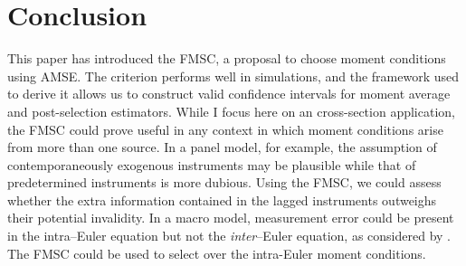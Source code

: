 \section{Conclusion}
\label{sec:conclude}
This paper has introduced the FMSC, a proposal to choose moment conditions using AMSE. 
The criterion performs well in simulations, and the framework used to derive it allows us to construct valid confidence intervals for moment average and post-selection estimators.  
While I focus here on an cross-section application, the FMSC could prove useful in any context in which moment conditions arise from more than one source. 
In a panel model, for example, the assumption of contemporaneously exogenous instruments may be plausible while that of predetermined instruments is more dubious.
Using the FMSC, we could assess whether the extra information contained in the lagged instruments outweighs their potential invalidity. 
In a macro model, measurement error could be present in the intra--Euler equation but not the \emph{inter}--Euler equation, as considered by \cite{Eichenbaum}. 
The FMSC could be used to select over the intra-Euler moment conditions.